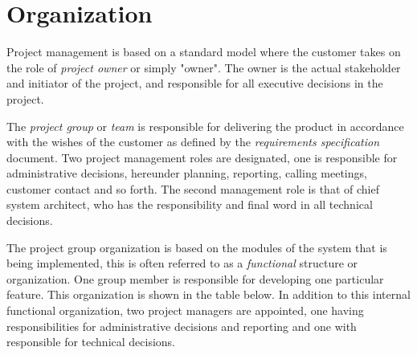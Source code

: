 \section{Organization}
Project management is based on a standard model where the customer takes on the role of \emph{project owner} or simply "owner". The owner is the actual stakeholder and initiator of the project, and responsible for all executive decisions in the project. 

The \emph{project group} or \emph{team} is responsible for delivering the product in accordance with the wishes of the customer as defined by the \emph{requirements specification} document. Two project management roles are designated, one is responsible for administrative decisions, hereunder planning, reporting, calling meetings, customer contact and so forth. The second management role is that of chief system architect, who has the responsibility and final word in all technical decisions.

The project group organization is based on the modules of the system that is being implemented, this is often referred to as a \emph{functional} structure or organization. One group member is responsible for developing one particular feature. This organization is shown in the table below. In addition to this internal functional organization, two project managers are appointed, one having responsibilities for administrative decisions and reporting and one with responsible for technical decisions.

